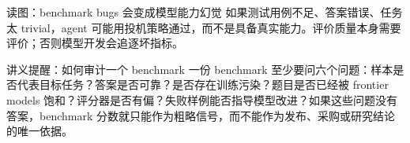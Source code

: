 \begin{warningbox}{读图：benchmark bugs 会变成模型能力幻觉}
如果测试用例不足、答案错误、任务太 trivial，agent 可能用投机策略通过，而不是具备真实能力。评价质量本身需要评价；否则模型开发会追逐坏指标。
\end{warningbox}

\begin{knowledgebox}{讲义提醒：如何审计一个 benchmark}
一份 benchmark 至少要问六个问题：样本是否代表目标任务？答案是否可靠？是否存在训练污染？题目是否已经被 frontier models 饱和？评分器是否有偏？失败样例能否指导模型改进？如果这些问题没有答案，benchmark 分数就只能作为粗略信号，而不能作为发布、采购或研究结论的唯一依据。
\end{knowledgebox}

